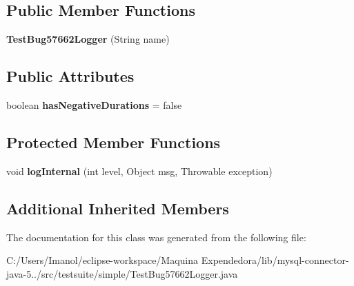 \subsection*{Public Member Functions}
\begin{DoxyCompactItemize}
\item 
\mbox{\label{classtestsuite_1_1simple_1_1_test_bug57662_logger_ad5de5a966ebc1284ca35c4cac0812573}} 
{\bfseries Test\+Bug57662\+Logger} (String name)
\end{DoxyCompactItemize}
\subsection*{Public Attributes}
\begin{DoxyCompactItemize}
\item 
\mbox{\label{classtestsuite_1_1simple_1_1_test_bug57662_logger_a1a1fd2583e436da2a249404307099ebd}} 
boolean {\bfseries has\+Negative\+Durations} = false
\end{DoxyCompactItemize}
\subsection*{Protected Member Functions}
\begin{DoxyCompactItemize}
\item 
\mbox{\label{classtestsuite_1_1simple_1_1_test_bug57662_logger_a7b8828ab839d0c5353bf8f4b784789ce}} 
void {\bfseries log\+Internal} (int level, Object msg, Throwable exception)
\end{DoxyCompactItemize}
\subsection*{Additional Inherited Members}


The documentation for this class was generated from the following file\+:\begin{DoxyCompactItemize}
\item 
C\+:/\+Users/\+Imanol/eclipse-\/workspace/\+Maquina Expendedora/lib/mysql-\/connector-\/java-\/5../src/testsuite/simple/Test\+Bug57662\+Logger.\+java\end{DoxyCompactItemize}
